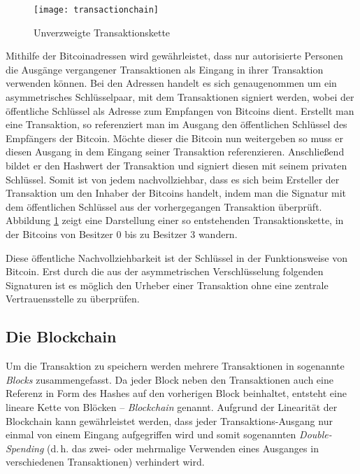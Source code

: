 \begin{figure}
    \begin{center}
        \texttt{[image: transactionchain]}
    	\caption{Unverzweigte Transaktionskette \parencite[2]{nakamoto}}
    	\label{fig:transactionchain}
    \end{center}
\end{figure}

Mithilfe der Bitcoinadressen wird gewährleistet, dass nur autorisierte Personen die Ausgänge vergangener Transaktionen als Eingang in ihrer Transaktion verwenden können.
Bei den Adressen handelt es sich genaugenommen um ein asymmetrisches Schlüsselpaar, mit dem Transaktionen signiert werden, wobei der öffentliche Schlüssel als Adresse zum Empfangen von Bitcoins dient.
Erstellt man eine Transaktion, so referenziert man im Ausgang den öffentlichen Schlüssel des Empfängers der Bitcoin.
Möchte dieser die Bitcoin nun weitergeben so muss er diesen Ausgang in dem Eingang seiner Transaktion referenzieren.
Anschließend bildet er den Hashwert der Transaktion und signiert diesen mit seinem privaten Schlüssel.
Somit ist von jedem nachvollziehbar, dass es sich beim Ersteller der Transaktion um den Inhaber der Bitcoins handelt, indem man die Signatur mit dem öffentlichen Schlüssel aus der vorhergegangen Transaktion überprüft.
Abbildung \ref{fig:transactionchain} zeigt eine Darstellung einer so entstehenden Transaktionskette, in der Bitcoins von Besitzer 0 bis zu Besitzer 3 wandern.

Diese öffentliche Nachvollziehbarkeit ist der Schlüssel in der Funktionsweise von Bitcoin.
Erst durch die aus der asymmetrischen Verschlüsselung folgenden Signaturen ist es möglich den Urheber einer Transaktion ohne eine zentrale Vertrauensstelle zu überprüfen.

\subsection{Die Blockchain}

Um die Transaktion zu speichern werden mehrere Transaktionen in sogenannte \emph{Blocks} zusammengefasst.
Da jeder Block neben den Transaktionen auch eine Referenz in Form des Hashes auf den vorherigen Block beinhaltet, entsteht eine lineare Kette von Blöcken -- \emph{Blockchain} genannt.
Aufgrund der Linearität der Blockchain kann gewährleistet werden, dass jeder Transaktions-Ausgang nur einmal von einem Eingang aufgegriffen wird und somit sogenannten \emph{Double-Spending} (d.\,h. das zwei- oder mehrmalige Verwenden eines Ausganges in verschiedenen Transaktionen) verhindert wird.

